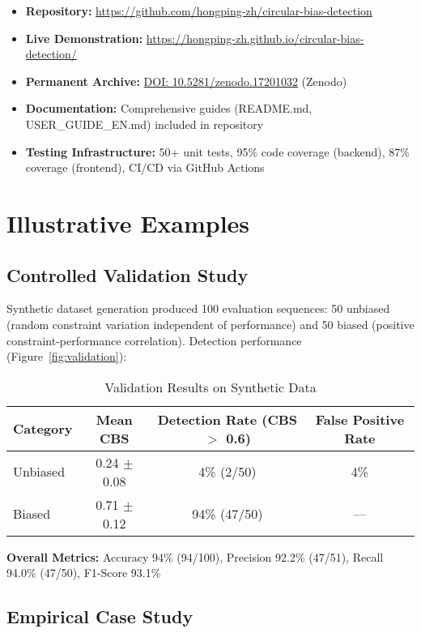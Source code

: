 \documentclass[10pt]{article}
\begin{document}
\begin{itemize}
    \item \textbf{Repository:} \url{https://github.com/hongping-zh/circular-bias-detection}
    \item \textbf{Live Demonstration:} \url{https://hongping-zh.github.io/circular-bias-detection/}
    \item \textbf{Permanent Archive:} \href{https://doi.org/10.5281/zenodo.17201032}{DOI: 10.5281/zenodo.17201032} (Zenodo)
    \item \textbf{Documentation:} Comprehensive guides (README.md, USER\_GUIDE\_EN.md) included in repository
    \item \textbf{Testing Infrastructure:} 50+ unit tests, 95\% code coverage (backend), 87\% coverage (frontend), CI/CD via GitHub Actions
\end{itemize}

\section{Illustrative Examples}

\subsection{Controlled Validation Study}

Synthetic dataset generation produced 100 evaluation sequences: 50 unbiased (random constraint variation independent of performance) and 50 biased (positive constraint-performance correlation). Detection performance (Figure~\ref{fig:validation}):

\begin{table}[h]
\centering
\caption{Validation Results on Synthetic Data}
\begin{tabular}{lccc}
\toprule
Category & Mean CBS & Detection Rate (CBS $>$ 0.6) & False Positive Rate \\
\midrule
Unbiased & 0.24 $\pm$ 0.08 & 4\% (2/50) & 4\% \\
Biased & 0.71 $\pm$ 0.12 & 94\% (47/50) & --- \\
\bottomrule
\end{tabular}
\end{table}

\textbf{Overall Metrics:} Accuracy 94\% (94/100), Precision 92.2\% (47/51), Recall 94.0\% (47/50), F1-Score 93.1\%

\subsection{Empirical Case Study}
\end{document}
